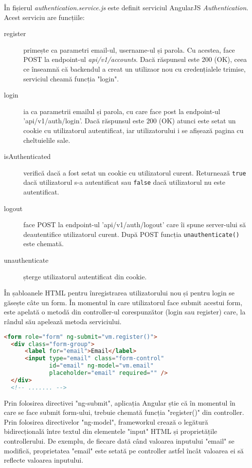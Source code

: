 În fișierul \emph{authentication.service.js} este definit serviciul
AngularJS \emph{Authentication}. Acest serviciu are funcțiile:
\begin{description}
\item [register] primește ca parametri email-ul, username-ul și
parola. Cu acestea, face POST la endpoint-ul \emph{api/v1/accounts}.
Dacă răspunsul este 200 (OK), ceea ce înseamnă că backendul
a creat un utilizaor nou cu credențialele trimise,
serviciul cheamă funcția "login".
\item [login] ia ca parametrii emailul și parola, cu care
face post la endpoint-ul 'api/v1/auth/login'. Dacă răspunsul este
200 (OK) atunci este setat un cookie cu utilizatorul autentificat,
iar utilizatorului i se afișează pagina cu cheltuielile sale.
\item [isAuthenticated] verifică dacă a fost setat
un cookie cu utilizatorul curent. Returnează \texttt{true} dacă 
utilizatorul s-a autentificat sau \texttt{false} dacă utilizatorul
nu este autentificat.
\item [logout] face POST la endpoint-ul 'api/v1/auth/logout' care îi
spune server-ului să deautentifice utilizatorul curent. După POST 
funcția \texttt{unauthenticate()} este chemată.
\item [unauthenticate] șterge utilizatorul autentificat din cookie.
\end{description}



În șabloanele HTML pentru înregistrarea utilizatorului nou și pentru
login se găsește câte un form. În momentul în care utilizatorul face
submit acestui form, este apelată o metodă din controller-ul corespunzător
(login sau register) care, la rândul său apelează metoda serviciului.

\begin{lstlisting}[language=html, title=static/templates/authentication/register.html]
<form role="form" ng-submit="vm.register()">
  <div class="form-group">
      <label for="email">Email</label>
      <input type="email" class="form-control" 
             id="email" ng-model="vm.email"
             placeholder="email" required="" />
  </div>
  <!-- ....... -->
\end{lstlisting}

Prin folosirea directivei "ng-submit", aplicația Angular știe
că în momentul în care se face submit form-ului, trebuie
chemată funcția "register()" din controller. Prin folosirea
directivelor "ng-model", frameworkul crează o legătură
bidirecțională între textul din elementele "input" HTML
și proprietățile controllerului. De exemplu, de fiecare
dată când valoarea inputului "email" se modifică,
proprietatea "email" este setată pe controller astfel încât
valoarea ei să reflecte valoarea inputului.

